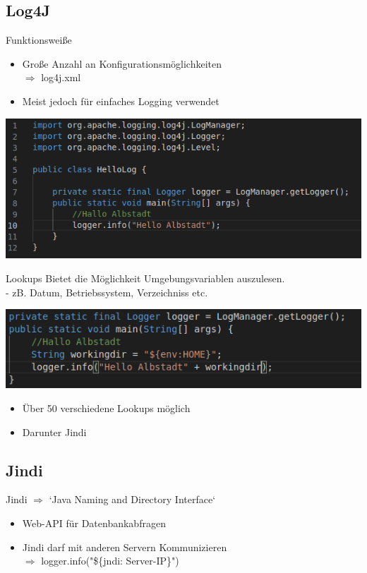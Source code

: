 \documentclass{beamer}
\begin{document}
\subsection{Log4J}
\begin{frame}{Funktionsweiße}
\begin{itemize}
 \item Große Anzahl an Konfigurationsmöglichkeiten\\
$\Rightarrow$ log4j.xml
\item Meist jedoch für einfaches Logging verwendet
\end{itemize}
\begin{center}
\includegraphics[scale=0.45]{log4jexample.png}
\end{center}
\end{frame}
\begin{frame}
 \begin{block}{Lookups}
  Bietet die Möglichkeit Umgebungsvariablen auszulesen.\\
  - zB. Datum, Betriebssystem, Verzeichniss etc.
 \end{block}
 \begin{center}
 \includegraphics[scale=0.45]{lookupsexample.png}
 \end{center}
 \begin{itemize}
  \item  Über 50 verschiedene Lookups möglich
  \item  Darunter Jindi
 \end{itemize}


 \end{frame}

\subsection{Jindi}
\begin{frame}{Jindi}
$\Rightarrow$ `Java Naming and Directory Interface`
\begin{itemize}
 \item Web-API für Datenbankabfragen
 \item Jindi darf mit anderen Servern Kommunizieren\\
 $\Rightarrow$ logger.info("\$\{jndi: Server-IP\}")
\end{itemize}

\end{frame}
\end{document}
